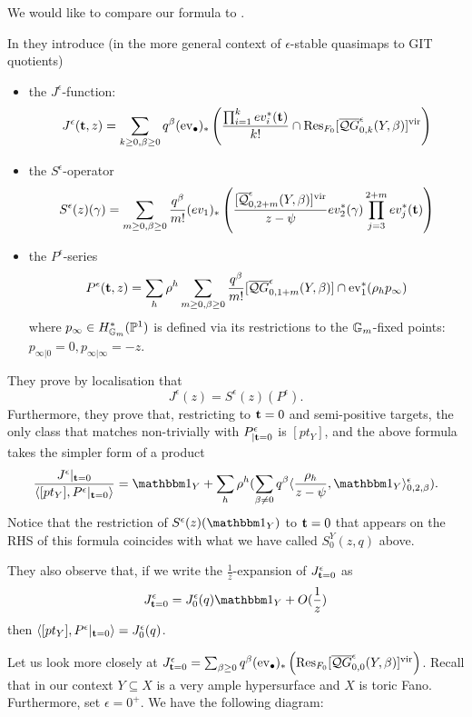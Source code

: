 We would like to compare our formula to \cite[Corollary 5.5.1]{CF-K-wallcrossing}.

In \cite[Section 5]{CF-K-wallcrossing} they introduce (in the more general context of $\epsilon$-stable quasimaps to GIT quotients)
\begin{itemize}
 \item the $J^{\epsilon}$-function:
 \[
  J^\epsilon({\bf t}, z)=\sum_{k\geq 0,\beta\geq 0}q^\beta(\operatorname{ev}_\bullet)_*\left(\frac{\prod_{i=1}^k ev_i^*({\bf t})}{k!}\cap\operatorname{Res}_{F_0}[\overline{\mathcal QG}^{\epsilon}_{0,k}(Y,\beta)]^{\text{vir}}\right)
 \]
\item the $S^\epsilon$-operator
\[
 S^\epsilon(z)(\gamma)=\sum_{m\ge 0,\beta\ge 0}\frac{q^\beta}{m!} 
(ev_1)_*\left(\frac{[\overline{\mathcal Q}^{\epsilon}_{0,2+m}(Y,\beta)]^{\text{vir}}}{z-\psi}ev_2^*(\gamma)\prod_{j=3}^{2+m}ev_j^*({\bf t})\right)
\]
\item the $P^\epsilon$-series
\[
 P^\epsilon({\bf t}, z)=\sum_h\rho^h\sum_{m\geq 0,\beta\geq 0} \frac{q^\beta }{m!}
[\overline{\mathcal QG}^{\epsilon}_{0,1+m}(Y,\beta)]\cap \operatorname{ev}_1^*(\rho_h p_\infty)
\]
where $p_\infty\in H^*_{\mathbb{G}_m}(\mathbb P^1)$ is defined via its restrictions to the $\mathbb{G}_m$-fixed points: $p_{\infty|0}=0,p_{\infty|\infty}=-z$.
\end{itemize}
They prove by localisation that \cite[Theorem 5.4.1]{CF-K-wallcrossing}
\[
 J^\epsilon(z)=S^\epsilon(z)(P^\epsilon).
\]
Furthermore, they prove that, restricting to ${\bf t}=0$ and semi-positive targets, the only class that matches non-trivially with $P^\epsilon_{|{\bf t}=0}$ is $[pt_Y]$, and the above formula takes the simpler form of a product \cite[Corollary 5.5.1]{CF-K-wallcrossing}
\[
 \frac{J^\epsilon |_{{\bf t}=0}}{\langle [pt_Y],  P^\epsilon|_{{\bf t}=0}\rangle}=\mathbbm 1_Y+\sum_h\rho^h(\sum_{\beta\neq 0}q^\beta\langle\frac{\rho_h}{z-\psi},\mathbbm 1_Y\rangle_{0,2,\beta}^\epsilon).
\]
Notice that the restriction of $S^\epsilon(z)(\mathbbm 1_Y)$ to ${\bf t}=0$ that appears on the RHS of this formula coincides with what we have called $S^Y_0(z,q)$ above.

They also observe that, if we write the $\frac{1}{z}$-expansion of $J^{\epsilon}_{{\bf t}=0}$ as
\[
 J^{\epsilon}_{{\bf t}=0}=J^{\epsilon}_{0}(q)\mathbbm 1_Y+O(\frac{1}{z})
\]
then $\langle [pt_Y],  P^\epsilon|_{{\bf t}=0}\rangle=J^{\epsilon}_{0}(q)$.

Let us look more closely at $J^{\epsilon}_{{\bf t}=0}=\sum_{\beta\geq 0}q^\beta(\operatorname{ev}_\bullet)_*\left(\operatorname{Res}_{F_0}[\overline{\mathcal QG}^{\epsilon}_{0,0}(Y,\beta)]^{\text{vir}}\right)$. Recall that in our context $Y\subseteq X$ is a very ample hypersurface and $X$ is toric Fano. Furthermore, set $\epsilon=0^+$. We have the following diagram:

